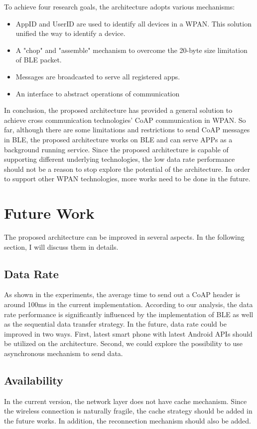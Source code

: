 \documentclass{Nan_Thesis}
\begin{document}
To achieve four research goals, the architecture adopts various mechanisms:

\begin{itemize}
  \item AppID and UserID are used to identify all devices in a WPAN. This solution unified the way to identify a device.
  \item A "chop" and "assemble" mechanism to overcome the 20-byte size limitation of BLE packet. 
  \item Messages are broadcasted to serve all registered apps.
  \item An interface to abstract operations of communication   
\end{itemize}

In conclusion, the proposed architecture has provided a general solution to achieve cross communication technologies’ CoAP communication in WPAN. So far, although there are some limitations and restrictions to send CoAP messages in BLE, the proposed architecture works on BLE and can serve APPs as a background running service. Since the proposed architecture is capable of supporting different underlying technologies, the low data rate performance should not be a reason to stop explore the potential of the architecture. In order to support other WPAN technologies, more works need to be done in the future.
\section{Future Work}
The proposed architecture can be improved in several aspects. In the following section, I will discuss them in details. 
\subsection{Data Rate}
As shown in the experiments, the average time to send out a CoAP header is around 100ms in the current implementation. According to our analysis, the data rate performance is significantly influenced by the implementation of BLE as well as the sequential data transfer strategy. In the future, data rate could be improved in two ways.  First, latest smart phone with latest Android APIs should be utilized on the architecture. Second, we could explore the possibility to use asynchronous mechanism to send data. 
\subsection{Availability}
In the current version, the network layer does not have cache mechanism. Since the wireless connection is naturally fragile, the cache strategy should be added in the future works. In addition, the reconnection mechanism should also be added.
\end{document}
